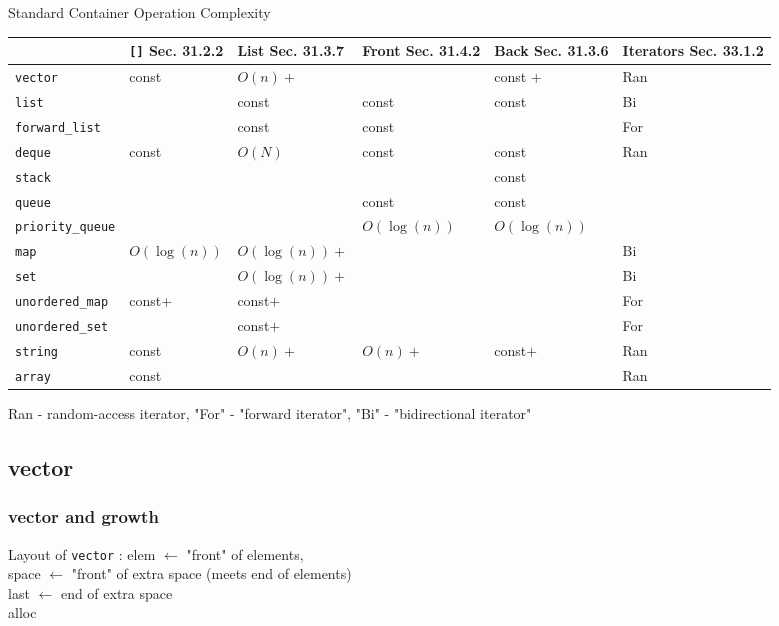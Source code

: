 \documentclass[10pt]{amsart}
\begin{document}
\begin{multicols*}{2}
Standard Container Operation Complexity
\begin{center}
	\begin{tabular}{ l | l | l | l | l | l }
		\hline
		& \verb|[]| Sec. 31.2.2 & List Sec. 31.3.7 & Front Sec. 31.4.2 & Back Sec. 31.3.6 & Iterators  Sec. 33.1.2 \\ \hline \hline
		\verb|vector| & const & $O(n)+$ &  & const $+$ & Ran \\ \hline 
		\verb|list| &  & const &  const  & const & Bi \\ \hline 
		\verb|forward_list| &  & const &  const  &  & For \\ \hline 
		\verb|deque| & const & $O(N)$ &  const  & const & Ran \\ \hline \hline 
		\verb|stack| &  &  &   & const &  \\ \hline 
		\verb|queue| &  &  & const  & const &  \\ \hline 
		\verb|priority_queue| &  &  & $O(\log{(n)})$  & $O(\log{(n)})$ &  \\ \hline \hline
		\verb|map| & $O(\log{(n)})$ & $O(\log{(n)})+$ & & & Bi \\ \hline
		\verb|set| &  & $O(\log{(n)})+$ & & & Bi \\ \hline
		\verb|unordered_map| & const+ & const$+$ & & & For \\ \hline
		\verb|unordered_set| &  & const$+$ & & & For \\ \hline \hline 
		\verb|string| & const & $O(n)+$ & $O(n)+$ & const$+$ & Ran \\ \hline
		\verb|array| & const &  & & & Ran \\ \hline 	
		\hline
	\end{tabular}
\end{center}
Ran - random-access iterator, "For" - "forward iterator", "Bi" - "bidirectional iterator"

\subsection{vector}

\subsubsection{vector and growth}

Layout of \verb|vector| : elem $\leftarrow$ "front" of elements, \\
space $\leftarrow$ "front" of extra space (meets end of elements) \\
last $\leftarrow$ end of extra space \\
alloc


\end{multicols*}
\end{document}
